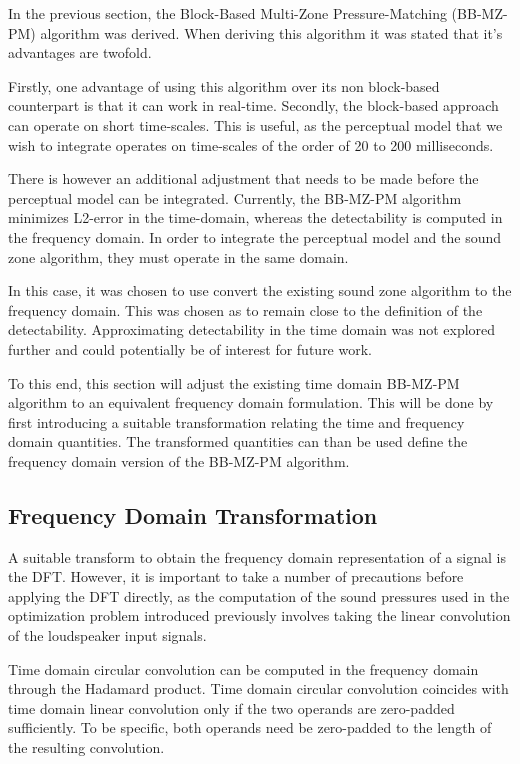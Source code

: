 In the previous section, the Block-Based Multi-Zone Pressure-Matching (BB-MZ-PM) algorithm was derived.
When deriving this algorithm it was stated that it's advantages are twofold.

Firstly, one advantage of using this algorithm over its non block-based counterpart is that it can work in real-time.
Secondly, the block-based approach can operate on short time-scales.
This is useful, as the perceptual model that we wish to integrate operates on time-scales of the order of 20 to 200 milliseconds.

There is however an additional adjustment that needs to be made before the perceptual model can be integrated. 
Currently, the BB-MZ-PM algorithm minimizes L2-error in the time-domain, whereas the detectability is computed in the 
frequency domain.
In order to integrate the perceptual model and the sound zone algorithm, they must operate in the same domain.

In this case, it was chosen to use convert the existing sound zone algorithm to the frequency domain.
This was chosen as to remain close to the definition of the detectability.
Approximating detectability in the time domain was not explored further and could potentially be of interest for future work.

To this end, this section will adjust the existing time domain BB-MZ-PM algorithm to an equivalent frequency domain formulation.
This will be done by first introducing a suitable transformation relating the time and frequency domain quantities.
The transformed quantities can than be used define the frequency domain version of the BB-MZ-PM algorithm.

\subsection{Frequency Domain Transformation}
A suitable transform to obtain the frequency domain representation of a signal is the DFT.
However, it is important to take a number of precautions before applying the DFT directly,
as the computation of the sound pressures used in the optimization problem introduced previously involves taking the 
linear convolution of the loudspeaker input signals.

Time domain circular convolution can be computed in the frequency domain through the Hadamard product.
Time domain circular convolution coincides with time domain linear convolution only if the two operands are zero-padded sufficiently.
To be specific, both operands need be zero-padded to the length of the resulting convolution.

